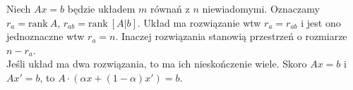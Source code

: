 \begin{theorem} 
	Niech \( Ax = b \) będzie układem \( m \) równań z \( n \) niewiadomymi. Oznaczamy \( r_{a} = \text{rank}\: A \), \( r_{ab} = \text{rank}\: [A|b] \). Układ ma rozwiązanie wtw \( r_{a} = r_{ab} \) i jest ono jednoznaczne wtw \( r_{a} = n \). Inaczej rozwiązania stanowią przestrzeń \linebreak o rozmiarze \( n - r_{a} \). \\
	Jeśli układ ma dwa rozwiązania, to ma ich nieskończenie wiele. Skoro \( Ax = b \) i \( Ax' = b \), \linebreak to \( A \cdot (\alpha x + (1 - \alpha)x') = b \).
\end{theorem}
